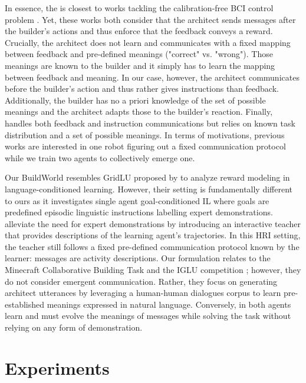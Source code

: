 In essence, the \abp is closest to works tackling the calibration-free BCI control problem \citep{grizou:hal-00984068, xie2021interaction}. Yet, these works both consider that the architect sends messages after the builder's actions and thus enforce that the feedback conveys a reward. Crucially, the architect does not learn and communicates with a fixed mapping between feedback and pre-defined meanings ("correct" vs. "wrong"). Those meanings are known to the builder and it simply has to learn the mapping between feedback and meaning. In our case, however, the architect communicates before the builder's action and thus rather gives instructions than feedback. Additionally, the builder has no a priori knowledge of the set of possible meanings and the architect adapts those to the builder's reaction. Finally, \citet{grizou2013robot} handles both feedback and instruction communications but relies on known task distribution and a set of possible meanings. In terms of motivations, previous works are interested in one robot figuring out a fixed communication protocol while we train two agents to collectively emerge one.

Our BuildWorld resembles GridLU proposed by \citet{bahdanau2019learning} to analyze reward modeling in language-conditioned learning. However, their setting is fundamentally different to ours as it investigates single agent goal-conditioned IL where goals are predefined episodic linguistic instructions labelling expert demonstrations. \citet{nguyen2021interactive} alleviate the need for expert demonstrations by introducing an interactive teacher that provides descriptions of the learning agent's trajectories. In this HRI setting, the teacher still follows a fixed pre-defined communication protocol known by the learner: messages are activity descriptions.
Our \abp formulation relates to the Minecraft Collaborative Building Task \citep{narayan2019collaborative} and the IGLU competition \citep{kiseleva2021neurips}; 
however, they do not consider emergent communication. Rather, they focus on %
generating architect utterances by leveraging a human-human dialogues corpus to learn pre-established meanings expressed in natural language. Conversely, in \abp both agents learn and must evolve the meanings of messages while solving the task without relying on any form of demonstration. 

\section{Experiments}

